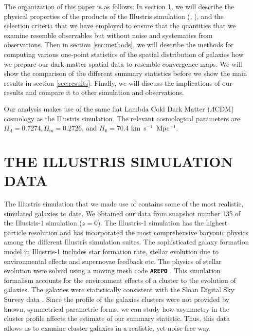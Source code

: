 The organization of this paper is as follows:
In section \ref{sec:illustris_sim}, we will describe the physical properties of 
the products of the Illustris
simulation (\citealt{Vogelsberger2014}, \citealt{Genel2014a}), 
and the selection criteria that we have employed to ensure that the
quantities that we examine resemble observables but without noise and
systematics from observations. 
Then in section \ref{sec:methods}, 
we will describe the methods for computing various 
one-point statistics of the spatial distribution of galaxies how we prepare our dark
matter spatial data to resemble convergence maps. We will show the comparison
of the different summary statistics before we show the main results
in section \ref{sec:results}. Finally, we will discuss the implications of our
results and compare it to other simulation and observations.

Our analysis makes use of the same flat Lambda Cold Dark Matter ($\Lambda$CDM) cosmology
as the Illustris simulation. The relevant cosmological parameters are
$\Omega_\Lambda = 0.7274, \Omega_m = 0.2726$, and $H_0 = 70.4$
km~s$^{-1}$~Mpc$^{-1}$.

\section{THE ILLUSTRIS SIMULATION DATA} 
\label{sec:illustris_sim}


The Illustris simulation that we made use of contains some of the most
realistic, simulated galaxies to date. We obtained our data from 
snapshot number 135 of the Illustris-1 simulation ($z=0$). The Illustris-1
simulation has the highest particle resolution and has incorporated the most 
comprehensive baryonic physics among the different Illustris simulation suites. 
The sophisticated galaxy formation model in Illustris-1 
 includes star formation rate, stellar evolution due to
environmental effects and supernovae feedback etc. The physics of stellar
evolution were solved using a moving mesh code {\bf \texttt{AREPO}} \citep{Springel2010}.
This simulation formalism accounts for the environment effects of a cluster to the
evolution of galaxies. The galaxies were statistically consistent
with the Sloan Digital Sky Survey data
\citet{Vogelsberger2014}. Since the profile of the galaxies clusters were not
provided by known, symmetrical parametric forms, we can study 
how asymmetry in the cluster profile affects the estimate of our summary 
statistic. Thus, this data allows us to examine cluster galaxies
in a realistic, yet noise-free way.

